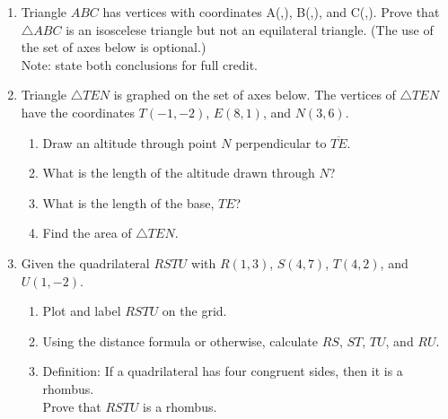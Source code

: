 \documentclass[12pt, twoside]{article}
\begin{document}
\begin{enumerate}
    \item Triangle $ABC$ has vertices with coordinates A(,), B(,), and C(,). Prove that $\triangle ABC$ is an isoscelese triangle but not an equilateral triangle. (The use of the set of axes below is optional.)\\
    Note: state both conclusions for full credit.

    \item Triangle $\triangle TEN$ is graphed on the set of axes below. The vertices of $\triangle TEN$ have the coordinates $T(-1,-2)$, $E(8,1)$, and $N(3,6)$.
      \begin{center} %
      \end{center}
      \begin{enumerate}
        \item Draw an altitude through point $N$ perpendicular to $\overline{TE}$.
        \item What is the length of the altitude drawn through $N$?
        \item What is the length of the base, $TE$?
        \item Find the area of  $\triangle TEN$.
      \end{enumerate}

      \item Given the quadrilateral $RSTU$ with $R(1,3)$, $S(4,7)$, $T(4,2)$, and $U(1,-2)$.
        \begin{enumerate}
          \item Plot and label $RSTU$ on the grid.
          \item Using the distance formula or otherwise, calculate $RS$, $ST$, $TU$, and $RU$.
          \item Definition: If a quadrilateral has four congruent sides, then it is a rhombus.\\[0.5cm]
          Prove that $RSTU$ is a rhombus.
        \end{enumerate}
        \begin{center} %
        \end{center}


\end{enumerate}
\end{document}
